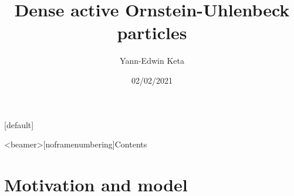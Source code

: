 \documentclass{beamer}
\title{Dense active Ornstein-Uhlenbeck particles}
\author{Yann-Edwin Keta}
\date{02/02/2021}
\begin{document}

{
\makeatletter
    [default]
    \def\beamer@entrycode{\vspace*{-\headheight}}
\begin{frame}[noframenumbering]

\titlepage

\end{frame}
}


{\footerwithoutframenumber
\begin{frame}<beamer>[noframenumbering]{Contents}
  \tableofcontents
\end{frame}
}


\section{Motivation and model}
\end{document}
